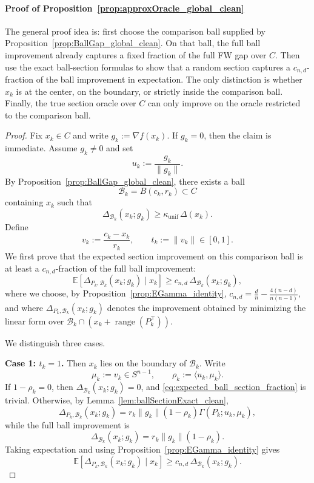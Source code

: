 \documentclass{article}
\DeclareMathOperator{\range}{range}
\begin{document}
\paragraph{Proof of Proposition~\ref{prop:approxOracle_global_clean}} 
The general proof idea is:
first choose the comparison ball supplied by
Proposition~\ref{prop:BallGap_global_clean}. On that ball, the full ball
improvement already captures a fixed fraction of the full FW gap over \(C\).
Then use the exact ball-section formulas to show that a random section captures
a \(c_{n,d}\)-fraction of the ball improvement in expectation. The only
distinction is whether \(x_k\) is at the center, on the boundary, or strictly
inside the comparison ball. Finally, the true section oracle over \(C\) can only
improve on the oracle restricted to the comparison ball.
\begin{proof}
Fix \(x_k\in C\) and write \(g_k:=\nabla f(x_k)\). If \(g_k=0\), then the
claim is immediate. Assume \(g_k\neq0\) and set
\[
u_k:=\frac{g_k}{\|g_k\|}.
\]
By Proposition~\ref{prop:BallGap_global_clean}, there exists a ball
\[
\mathcal B_k=B(c_k,r_k)\subset C
\]
containing \(x_k\) such that
\[
\Delta_{\mathcal B_k}(x_k;g_k)
\ge
\kappa_{\mathrm{unif}}\,\Delta(x_k).
\]
Define
\[
v_k:=\frac{c_k-x_k}{r_k},
\qquad
t_k:=\|v_k\|\in[0,1].
\]
We first prove that the expected section improvement on this comparison ball is
at least a \(c_{n,d}\)-fraction of the full ball improvement:
\begin{equation}
\mathbb E\!\left[
\Delta_{P_k,\mathcal B_k}(x_k;g_k)
\mid x_k
\right]
\ge
c_{n,d}\,\Delta_{\mathcal B_k}(x_k;g_k),
\label{eq:expected_ball_section_fraction}
\end{equation}
where we choose, by Proposition~\ref{prop:EGamma_identity}, 
$c_{n,d}=
\frac dn-\frac{4(n-d)}{n(n-1)},$
and where \(\Delta_{P_k,\mathcal B_k}(x_k;g_k)\) denotes the improvement obtained by
minimizing the linear form over
\(\mathcal B_k\cap(x_k+\range(P_k^\top))\).

We distinguish three cases.

\smallskip
\noindent\textbf{Case 1: \(t_k=1\).}
Then \(x_k\) lies on the boundary of \(\mathcal B_k\). Write
\[
\mu_k:=v_k\in S^{n-1},
\qquad
\rho_k:=\langle u_k,\mu_k\rangle.
\]
If \(1-\rho_k=0\), then
\(\Delta_{\mathcal B_k}(x_k;g_k)=0\), and
\eqref{eq:expected_ball_section_fraction} is trivial. Otherwise, by
Lemma~\ref{lem:ballSectionExact_clean},
\[
\Delta_{P_k,\mathcal B_k}(x_k;g_k)
=
r_k\|g_k\|(1-\rho_k)\Gamma(P_k;u_k,\mu_k),
\]
while the full ball improvement is
\[
\Delta_{\mathcal B_k}(x_k;g_k)
=
r_k\|g_k\|(1-\rho_k).
\]
Taking expectation and using Proposition~\ref{prop:EGamma_identity} gives
\[
\mathbb E[
\Delta_{P_k,\mathcal B_k}(x_k;g_k)
\mid x_k]
\ge
c_{n,d}\,\Delta_{\mathcal B_k}(x_k;g_k).
\]


\end{proof}
\end{document}
